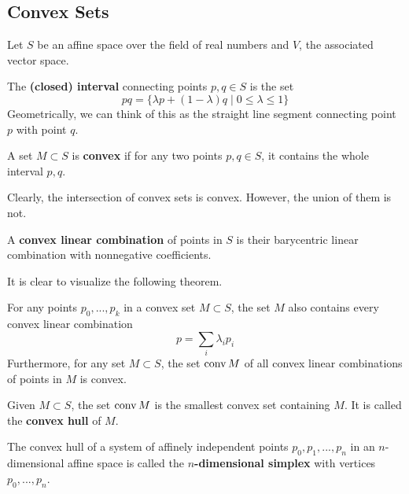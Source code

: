 \subsection{Convex Sets}

  Let $S$ be an affine space over the field of real numbers and $V$, the associated vector space. 

  \begin{definition}
    The \textbf{(closed) interval} connecting points $p, q \in S$ is the set
    \begin{equation}
      pq = \{\lambda p + (1-\lambda) q \;|\; 0 \leq \lambda \leq 1\}
    \end{equation}
    Geometrically, we can think of this as the straight line segment connecting point $p$ with point $q$. 
  \end{definition}

  \begin{definition}
    A set $M \subset S$ is \textbf{convex} if for any two points $p, q \in S$, it contains the whole interval $p, q$. 
  \end{definition}

  Clearly, the intersection of convex sets is convex. However, the union of them is not. 

  \begin{definition}
    A \textbf{convex linear combination} of points in $S$ is their barycentric linear combination with nonnegative coefficients. 
  \end{definition}

  It is clear to visualize the following theorem. 

  \begin{theorem}
    For any points $p_0, ..., p_k$ in a convex set $M \subset S$, the set $M$ also contains every convex linear combination 
    \begin{equation}
      p = \sum_i \lambda_i p_i
    \end{equation}
    Furthermore, for any set $M \subset S$, the set $\operatorname{conv}{M}$ of all convex linear combinations of points in $M$ is convex. 
  \end{theorem}

  \begin{definition}
    Given $M \subset S$, the set $\operatorname{conv} M$ is the smallest convex set containing $M$. It is called the \textbf{convex hull} of $M$. 
  \end{definition}

  \begin{definition}
    The convex hull of a system of affinely independent points $p_0, p_1, ..., p_n$ in an $n$-dimensional affine space is called the \textbf{$n$-dimensional simplex} with vertices $p_0, ..., p_n$. 
  \end{definition}

